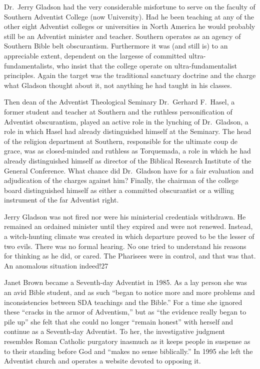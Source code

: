Dr.\ Jerry Gladson had the very considerable misfortune to serve on the
faculty of Southern Adventist College (now University). Had he been teaching
at any of the other eight Adventist colleges or universities in North
America he would probably still be an Adventist minister and teacher.
Southern operates as an agency of Southern Bible belt obscurantism.
Furthermore it was (and still is) to an appreciable extent, dependent on the
largesse of committed ultra-fundamentalists, who insist that the college
operate on ultra-fundamentalist principles. Again the target was the
traditional sanctuary doctrine and the charge what Gladson thought about it,
not anything he had taught in his classes.

Then dean of the Adventist Theological Seminary Dr.\ Gerhard F.\ Hasel, a
former student and teacher at Southern and the ruthless personification of
Adventist obscurantism, played an active role in the lynching of Dr.\
Gladson, a role in which Hasel had already distinguished himself at the
Seminary. The head of the religion department at Southern, responsible for
the ultimate coup de grace, was as closed-minded and ruthless as Torquemada, 
a role in which he had already distinguished himself as director of the
Biblical Research Institute of the General Conference. What chance did Dr.\
Gladson have for a fair evaluation and adjudication of the charges against
him? Finally, the chairman of the college board distinguished himself as
either a committed obscurantist or a willing instrument of the far Adventist
right.

Jerry Gladson was not fired nor were his ministerial credentials withdrawn.
He remained an ordained minister until they expired and were not renewed.
Instead, a witch-hunting climate was created in which departure proved to be
the lesser of two evils. There was no formal hearing. No one tried to
understand his reasons for thinking as he did, or cared. The Pharisees were
in control, and that was that. An anomalous situation indeed!27

Janet Brown became a Seventh-day Adventist in 1985. As a lay person she was
an avid Bible student, and as such ``began to notice more and more problems
and inconsistencies between SDA teachings and the Bible.'' For a time she
ignored these ``cracks in the armor of Adventism,'' but as ``the evidence
really began to pile up'' she felt that she could no longer ``remain honest''
with herself and continue as a Seventh-day Adventist. To her, the
investigative judgment resembles Roman Catholic purgatory inasmuch as it
keeps people in suspense as to their standing before God and ``makes no sense
biblically.'' In 1995 she left the Adventist church and operates a website
devoted to opposing it.

